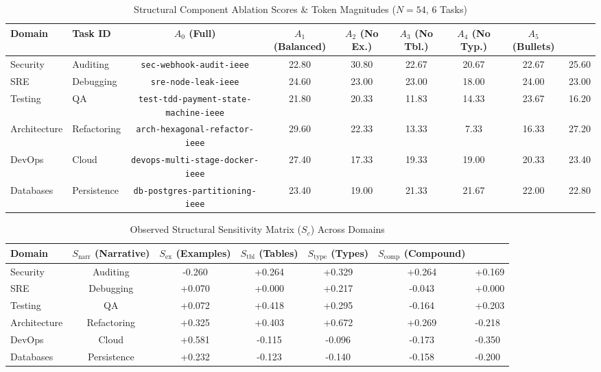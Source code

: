 \begin{table}[t]
\centering
\caption{Structural Component Ablation Scores & Token Magnitudes ($N=54$, 6 Tasks)}
\label{tab:ablation_scores}
\begin{tabular}{llcccccc}
\toprule
\textbf{Domain} & \textbf{Task ID} & \textbf{$A_0$ (Full)} & \textbf{$A_1$ (Balanced)} & \textbf{$A_2$ (No Ex.)} & \textbf{$A_3$ (No Tbl.)} & \textbf{$A_4$ (No Typ.)} & \textbf{$A_5$ (Bullets)} \\
\midrule
Security & Auditing & \texttt{sec-webhook-audit-ieee} & 22.80 & 30.80 & 22.67 & 20.67 & 22.67 & 25.60 \\
SRE & Debugging & \texttt{sre-node-leak-ieee} & 24.60 & 23.00 & 23.00 & 18.00 & 24.00 & 23.00 \\
Testing & QA & \texttt{test-tdd-payment-state-machine-ieee} & 21.80 & 20.33 & 11.83 & 14.33 & 23.67 & 16.20 \\
Architecture & Refactoring & \texttt{arch-hexagonal-refactor-ieee} & 29.60 & 22.33 & 13.33 & 7.33 & 16.33 & 27.20 \\
DevOps & Cloud & \texttt{devops-multi-stage-docker-ieee} & 27.40 & 17.33 & 19.33 & 19.00 & 20.33 & 23.40 \\
Databases & Persistence & \texttt{db-postgres-partitioning-ieee} & 23.40 & 19.00 & 21.33 & 21.67 & 22.00 & 22.80 \\
\bottomrule
\end{tabular}
\end{table}

\begin{table}[t]
\centering
\caption{Observed Structural Sensitivity Matrix ($S_c$) Across Domains}
\label{tab:sensitivity_matrix}
\begin{tabular}{lccccc}
\toprule
\textbf{Domain} & \textbf{$S_{\text{narr}}$ (Narrative)} & \textbf{$S_{\text{ex}}$ (Examples)} & \textbf{$S_{\text{tbl}}$ (Tables)} & \textbf{$S_{\text{type}}$ (Types)} & \textbf{$S_{\text{comp}}$ (Compound)} \\
\midrule
Security & Auditing & -0.260 & +0.264 & +0.329 & +0.264 & +0.169 \\
SRE & Debugging & +0.070 & +0.000 & +0.217 & -0.043 & +0.000 \\
Testing & QA & +0.072 & +0.418 & +0.295 & -0.164 & +0.203 \\
Architecture & Refactoring & +0.325 & +0.403 & +0.672 & +0.269 & -0.218 \\
DevOps & Cloud & +0.581 & -0.115 & -0.096 & -0.173 & -0.350 \\
Databases & Persistence & +0.232 & -0.123 & -0.140 & -0.158 & -0.200 \\
\bottomrule
\end{tabular}
\end{table}
